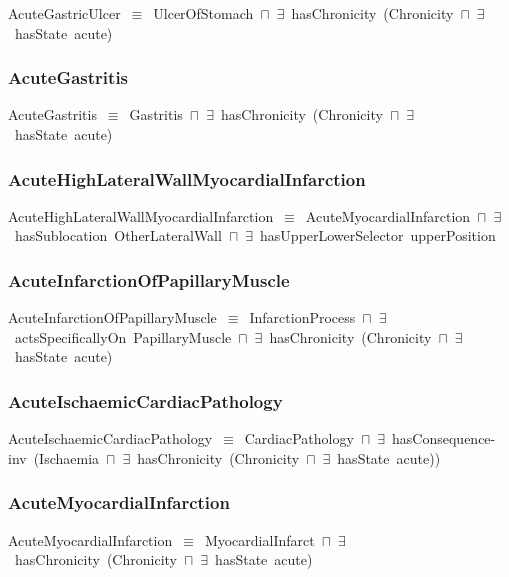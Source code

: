 \documentclass{article}
\begin{document}
AcuteGastricUlcer~\ensuremath{\equiv}~UlcerOfStomach~\ensuremath{\sqcap}~\ensuremath{\exists}~hasChronicity~(Chronicity~\ensuremath{\sqcap}~\ensuremath{\exists}~hasState~acute)

\subsubsection*{AcuteGastritis}

AcuteGastritis~\ensuremath{\equiv}~Gastritis~\ensuremath{\sqcap}~\ensuremath{\exists}~hasChronicity~(Chronicity~\ensuremath{\sqcap}~\ensuremath{\exists}~hasState~acute)

\subsubsection*{AcuteHighLateralWallMyocardialInfarction}

AcuteHighLateralWallMyocardialInfarction~\ensuremath{\equiv}~AcuteMyocardialInfarction~\ensuremath{\sqcap}~\ensuremath{\exists}~hasSublocation~OtherLateralWall~\ensuremath{\sqcap}~\ensuremath{\exists}~hasUpperLowerSelector~upperPosition

\subsubsection*{AcuteInfarctionOfPapillaryMuscle}

AcuteInfarctionOfPapillaryMuscle~\ensuremath{\equiv}~InfarctionProcess~\ensuremath{\sqcap}~\ensuremath{\exists}~actsSpecificallyOn~PapillaryMuscle~\ensuremath{\sqcap}~\ensuremath{\exists}~hasChronicity~(Chronicity~\ensuremath{\sqcap}~\ensuremath{\exists}~hasState~acute)

\subsubsection*{AcuteIschaemicCardiacPathology}

AcuteIschaemicCardiacPathology~\ensuremath{\equiv}~CardiacPathology~\ensuremath{\sqcap}~\ensuremath{\exists}~hasConsequence-inv~(Ischaemia~\ensuremath{\sqcap}~\ensuremath{\exists}~hasChronicity~(Chronicity~\ensuremath{\sqcap}~\ensuremath{\exists}~hasState~acute))

\subsubsection*{AcuteMyocardialInfarction}

AcuteMyocardialInfarction~\ensuremath{\equiv}~MyocardialInfarct~\ensuremath{\sqcap}~\ensuremath{\exists}~hasChronicity~(Chronicity~\ensuremath{\sqcap}~\ensuremath{\exists}~hasState~acute)
\end{document}
